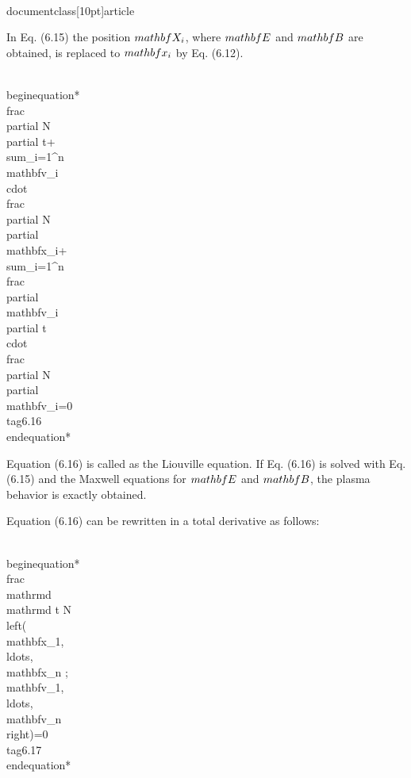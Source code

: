 \\documentclass[10pt]{article}
\begin{document}
{{{{In Eq. (6.15) the position $\\mathbf{X}_{i}$, where $\\mathbf{E}$ and $\\mathbf{B}$ are obtained, is replaced to $\\mathbf{x}_{i}$ by Eq. (6.12).


\\begin{equation*}
\\frac{\\partial N}{\\partial t}+\\sum_{i=1}^{n} \\mathbf{v}_{i} \\cdot \\frac{\\partial N}{\\partial \\mathbf{x}_{i}}+\\sum_{i=1}^{n} \\frac{\\partial \\mathbf{v}_{i}}{\\partial t} \\cdot \\frac{\\partial N}{\\partial \\mathbf{v}_{i}}=0 \\tag{6.16}
\\end{equation*}


Equation (6.16) is called as the Liouville equation. If Eq. (6.16) is solved with Eq. (6.15) and the Maxwell equations for $\\mathbf{E}$ and $\\mathbf{B}$, the plasma behavior is exactly obtained.

Equation (6.16) can be rewritten in a total derivative as follows:


\\begin{equation*}
\\frac{\\mathrm{d}}{\\mathrm{d} t} N\\left(\\mathbf{x}_{1}, \\ldots, \\mathbf{x}_{n} ; \\mathbf{v}_{1}, \\ldots, \\mathbf{v}_{n}\\right)=0 \\tag{6.17}
\\end{equation*}


}}}}
\end{document}
